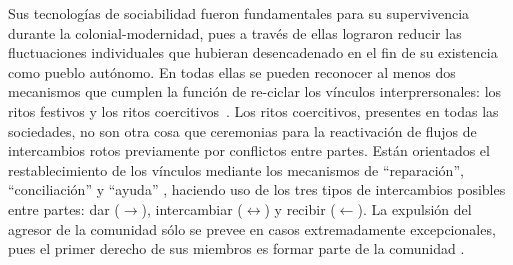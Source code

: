 \documentclass[a4paper,10pt]{book}
\theoremstyle{definition}
\begin{document}

Sus tecnologías de sociabilidad fueron fundamentales para su supervivencia durante la colonial-modernidad, pues a través de ellas lograron reducir las fluctuaciones individuales que hubieran desencadenado en el fin de su existencia como pueblo autónomo.
En todas ellas se pueden reconocer al menos dos mecanismos que cumplen la función de re-ciclar los v\'inculos interprersonales: los ritos festivos y los ritos coercitivos~\cite{segato2016-guerraContraLasMujeres}.
Los ritos coercitivos, presentes en todas las sociedades, no son otra cosa que ceremonias para la reactivación de flujos de intercambios rotos previamente por conflictos entre partes.
Están orientados el restablecimiento de los vínculos mediante los mecanismos de ``reparación'', ``conciliación'' y ``ayuda'' \cite{zaffaroni2013-cuestionCriminal}, haciendo uso de los tres tipos de intercambios posibles entre partes: dar ($\rightarrow$), intercambiar ($\leftrightarrow$) y recibir ($\leftarrow$).
La expulsión del agresor de la comunidad sólo se prevee en casos extremadamente excepcionales, pues el primer derecho de sus miembros es formar parte de la comunidad \cite{segato2016-guerraContraLasMujeres}.


\end{document}
